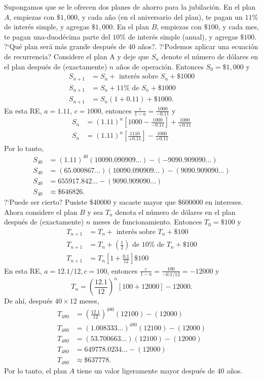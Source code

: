 Supongamos que se le ofrecen dos planes de ahorro para la jubilación. En el plan $A$, empiezas con $\$1,000$, y cada año (en el aniversario del plan), te pagan un $11\%$ de interés simple, y agregas $\$1,000$. En el plan $B$, empiezas con $\$100$, y cada mes, te pagan una-duodécima parte del $10\%$ de interés simple (anual), y agregas $\$100$. ?`Qué plan será más grande después de $40$ años?. ?`Podemos aplicar una ecuación de recurrencia? Considere el plan A y deje que $S_{n}$ denote el número de dólares en el plan después de (exactamente) $n$ años de operación. Entonces $S_{0}=\$1,000$ y
\begin{align*}
	S_{n+1}&= S_{n}+\text{ interés sobre }S_n+\$1000\\
	S_{n+1}&=S_{n}+11\%\text{ de }S_n+\$1000\\
	S_{n+1}&=S_{n}(1+0.11)+\$1000.
\end{align*}
En esta RE, $a=1.11$, $c=1000$, entonces $\frac{c}{1-a}=\frac{1000}{-0.11}$ y
\begin{align*}
	S_{n}&={\left(1.11\right)}^{n}\left[1000-\frac{1000}{-0.11}\right]+\frac{1000}{+0.11}\\
	S_{n}&={\left(1.11\right)}^{n}\left[\frac{1110}{+0.11}\right]-\frac{1000}{+0.11}
\end{align*}
Por lo tanto,
\begin{align*}
	S_{40}&={\left(1.11\right)}^{40}(10090.090909\ldots)-(-9090.909090\ldots)\\
	S_{40}&=(65.000867\ldots)(10090.090909\ldots)-(9090.909090\ldots)\\
	S_{40}&=655917.842\ldots-(9090.909090\ldots)\\
	S_{40}&\approx\$646826.
\end{align*}
?`Puede ser cierto? Pusiste $\$40000$ y sacaste mayor que $\$600000$ en intereses. Ahora considere el plan $B$ y sea $T_{n}$ denota el número de dólares en el plan después de (exactamente) $n$ meses de funcionamiento. Entonces $T_{0}=\$100$ y
\begin{align*}
	T_{n+1}&=T_{n}+\text{ interés sobre }T_{n}+\$100\\
	T_{n+1}&= T_{n}+\left(\frac{1}{2}\right)\text{ de }10\%\text{ de }T_{n}+\$100\\
	T_{n+1}&=T_{n}\left[1+\frac{0.1}{12}\right]\$100
\end{align*}
En esta RE, $a=12.1/12,c=100$, entonces $\frac{c}{1-a}=\frac{100}{-0.1/12}=-12000$ y
\begin{equation*}
	T_{n}={\left(\frac{12.1}{12}\right)}^{n}\left[100+12000\right]-12000.
\end{equation*}
De ahí, después $40\times12$ meses,
\begin{align*}
	T_{480}&={\left(\frac{12.1}{12}\right)}^{480}(12100)-(12000)\\
	T_{480}&={\left(1.008333\ldots\right)}^{480}(12100)-(12000)\\
	T_{480}&=\left(53.700663\ldots\right)(12100)-(12000)\\
	T_{480}&=649778.0234\ldots-(12000)\\
	T_{480}&\approx\$637778.
\end{align*}
Por lo tanto, el plan $A$ tiene un valor ligeramente mayor después de $40$ años.

